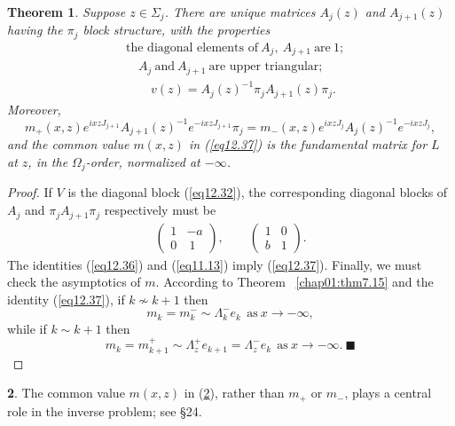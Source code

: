 \documentclass{surv-l}
\theoremstyle{plain}
\newtheorem{theorem}{Theorem}[section]
\theoremstyle{definition}
\newtheorem{remark}[theorem]{\sc{Remark}}
\numberwithin{equation}{chapter}
\begin{document}
\begin{theorem}\label{thm12.33}
Suppose $z\in\Sigma_{j}$. There are unique matrices $A_{j}(z)$ and $A_{j+1}(z)$ having the $\pi_{j}$ block structure, with the properties
\setcounter{equation}{33}
\begin{align}\label{eq12.34}
 & \text{the diagonal elements of}\ A_{j},\ A_{j+1}\ \text{are}\ 1; \\\label{eq12.35}
 & \quad A_{j}\ \text{and}\ A_{j+1}\ \text{are upper triangular};\\\label{eq12.36}
 & \quad\quad v(z)=A_{j}(z)^{-1}\pi_{j}A_{j+1}(z)\pi_{j}.
\end{align}
Moreover,
\begin{equation}\label{eq12.37}
m_{+}(x, z)e^{ixzJ_{j+1}}A_{j+1}(z)^{-1}e^{-ixzJ_{j+1}}\pi_{j}=m_{-}(x, z)e^{ixzJ_{j}}A_{j}(z)^{-1}e^{-ixzJ_{j}},
\end{equation}
and the common value $m(x, z)$ in \emph{(\ref{eq12.37})} is the fundamental matrix for $L$ at $z$, in the $\Omega_{j}$-order, normalized at $-\infty$.
\end{theorem}

\begin{proof}
 If $V$ is the diagonal block (\ref{eq12.32}), the corresponding diagonal blocks of $A_{j}$ and $\pi_{j}A_{j+1}\pi_{j}$ respectively must be
\begin{align*}
\left(\begin{array}{ll}
1 & -a\\
0 & {\ 1}
\end{array}\right),\qquad \left(\begin{array}{ll}
1 & 0\\
b & 1
\end{array}\right).
\end{align*}
The identities (\ref{eq12.36}) and (\ref{eq11.13}) imply (\ref{eq12.37}). Finally, we must check the asymptotics of $m$. According to Theorem ~\ref{chap01:thm7.15} and the identity (\ref{eq12.37}), if $ k\nsim k+1$ then
\begin{equation*}
m_{k}=m_{k}^{-}\sim\Lambda_{k}^{-}e_{k}\ \ \mathrm{as}\  x\rightarrow-\infty,
\end{equation*}
while if $k\sim k+1$ then
\begin{equation*}
m_{k}=m_{k+1}^{+}\sim\Lambda_{z}^{+}e_{k+1}=\Lambda_{z}^{-}e_{k}\ \ \mathrm{as}\  x\rightarrow-\infty.\ \blacksquare
\end{equation*}
 \end{proof}
\setcounter{theorem}{37}
\begin{remark}\label{rem12.38}
The common value $m(x, z)$ in (\ref{rem12.38}), rather than $m_{+}$ or $m_{-}$, plays a central role in the inverse problem; see \S24.
\end{remark}
\end{document}
